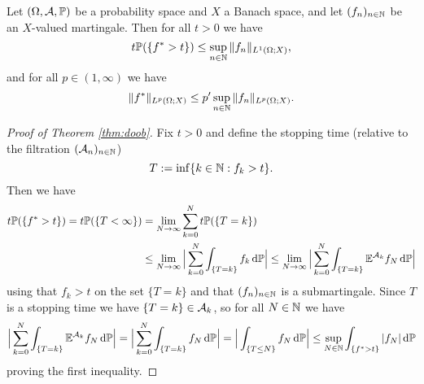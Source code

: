 \begin{cor}
  Let $(\Omega, \mathcal{A}, \mathbb{P})$ be a probability space and $X$ a Banach space,  and let $(f_{n})_{n \in \mathbb{N}}$ be an $X$-valued martingale.
  Then for all $t > 0$ we have
  \begin{equation*}
    t\mathbb{P}(\{f^* > t\}) \leq  \sup_{n \in \mathbb{N}} \|f_{n}\|_{L^1(\Omega;X)},
  \end{equation*}
  and for all $p \in (1,\infty)$ we have
  \begin{equation*}
    \|f^*\|_{L^p(\Omega;X)} \leq p' \sup_{n \in \mathbb{N}} \|f_{n}\|_{L^p(\Omega;X)}.
  \end{equation*}
\end{cor}

\begin{proof}[Proof of Theorem \ref{thm:doob}]
  Fix $t > 0$ and define the stopping time (relative to the filtration $(\mathcal{A}_{n})_{n \in \mathbb{N}}$)
  \begin{equation*}
    T :=  \inf\{k \in \mathbb{N} : f_k > t\}.
  \end{equation*}
  Then we have
  \begin{equation*}
    \begin{aligned}
      t\mathbb{P}(\{f^* > t\})
      = t\mathbb{P}(\{T < \infty\})
      &= \lim_{N \to \infty} \sum_{k = 0}^{N} t\mathbb{P}(\{T = k\}) \\
      &\leq \lim_{N \to \infty} \Big| \sum_{k = 0}^{N} \int_{\{T = k\}} f_k \, \mathrm{d}\mathbb{P} \Big| 
      \leq \lim_{N \to \infty} \Big| \sum_{k = 0}^{N} \int_{\{T = k\}} \mathbb{E}^{\mathcal{A}_{k}} f_N \, \mathrm{d}\mathbb{P} \Big|
    \end{aligned}
  \end{equation*}
  using that $f_k > t$ on the set $\{T = k\}$ and that $(f_{n})_{n \in \mathbb{N}}$ is a submartingale.
  Since $T$ is a stopping time we have $\{T = k\} \in \mathcal{A}_{k}$, so for all $N \in \mathbb{N}$ we have
  \begin{equation*}
    \Big| \sum_{k = 0}^{N} \int_{\{T = k\}} \mathbb{E}^{\mathcal{A}_{k}} f_N \, \mathrm{d}\mathbb{P} \Big|
    = \Big| \sum_{k = 0}^{N} \int_{\{T = k\}} f_{N} \, \mathrm{d}\mathbb{P} \Big|
    = \Big| \int_{\{T \leq N\}} f_{N} \, \mathrm{d}\mathbb{P} \Big|
    \leq \sup_{N \in \mathbb{N}} \int_{\{f^* > t\}} |f_{N}| \, \mathrm{d}\mathbb{P} 
  \end{equation*}
  proving the first inequality.


\end{proof}
